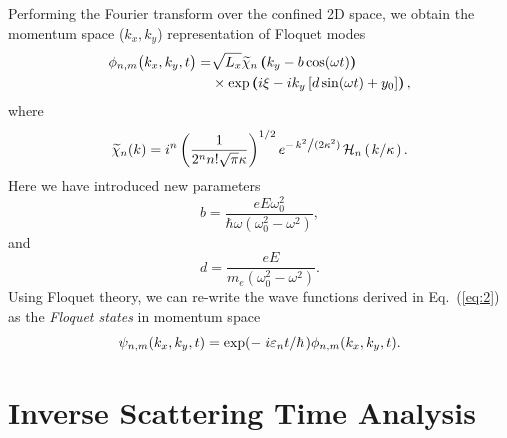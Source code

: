 \documentclass[
 reprint,
 amsmath,amssymb,
 aps,
 prb,
]{revtex4-2}
\begin{document}
Performing the Fourier transform over the confined 2D space, we obtain the momentum space ($k_x,k_y$) representation of Floquet modes
\begin{equation} \label{eq:10}
  \begin{aligned}
    \phi_{n,m}\big(k_x,k_y,t\big)  =&
    \sqrt{L_x}
    \widetilde{\chi}_{n} \bm{\left(}k_y - b\cos(\omega t)\bm{\right) }\\
    & \times
    \exp \bm{\left(} i\xi -ik_y  \left[d\sin(\omega t) + y_0 \right] \bm{\right)},
  \end{aligned}
\end{equation}
where
\begin{equation} \label{eq:11}
  \widetilde{\chi}_{n}(k) =
  i^n \left(\frac{1}{ 2^{n} n! \sqrt{\pi} \kappa}\right)^{1/2}
  e^{-\flatfrac{k^2}{(2 \kappa^2)}}
  \mathcal{H}_{n} \left(\flatfrac{k}{\kappa}\right).
\end{equation}
Here we have introduced new parameters
\begin{equation} \label{eq:12}
  b =
  \frac{eE\omega_0^2}{\hbar\omega(\omega_0^2 - \omega^2)},
\end{equation}
and
\begin{equation} \label{eq:13}
  d =
 \frac{eE}{m_e(\omega_0^2 - \omega^2)}.
\end{equation}
Using Floquet theory, we can re-write the wave functions derived in Eq.~(\ref{eq:2}) as the \textit{Floquet states} in momentum space
\begin{equation} \label{eq:14}
  \psi_{n,m}(k_x,k_y,t) =
  \exp(-\flatfrac{i\varepsilon_{n}t}{\hbar}) \phi_{n,m} (k_x,k_y,t).
\end{equation}

\section{\label{sec:inverse_scattering_time}  Inverse Scattering Time Analysis}
\end{document}
